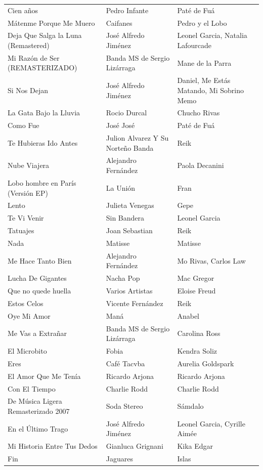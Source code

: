 \begin{longtable}{p{} p{} p{}}
Cien años & Pedro Infante & Paté de Fuá \\
Mátenme Porque Me Muero & Caifanes & Pedro y el Lobo \\
Deja Que Salga la Luna (Remastered) & José Alfredo Jiménez & Leonel Garcia, Natalia Lafourcade \\
Mi Razón de Ser (REMASTERIZADO) & Banda MS de Sergio Lizárraga & Mane de la Parra \\
Si Nos Dejan & José Alfredo Jiménez & Daniel, Me Estás Matando, Mi Sobrino Memo \\
La Gata Bajo la Lluvia & Rocio Durcal & Chucho Rivas \\
Como Fue & José José & Paté de Fuá \\
Te Hubieras Ido Antes & Julion Alvarez Y Su Norteño Banda & Reik \\
Nube Viajera & Alejandro Fernández & Paola Decanini \\
Lobo hombre en París (Versión EP) & La Unión & Fran \\
Lento & Julieta Venegas & Gepe \\
Te Vi Venir & Sin Bandera & Leonel Garcia \\
Tatuajes & Joan Sebastian & Reik \\
Nada & Matisse & Matisse \\
Me Hace Tanto Bien & Alejandro Fernández & Mo Rivas, Carlos Law \\
Lucha De Gigantes & Nacha Pop & Mac Gregor \\
Que no quede huella & Varios Artistas & Eloise Freud \\
Estos Celos & Vicente Fernández & Reik \\
Oye Mi Amor & Maná & Anabel \\
Me Vas a Extrañar & Banda MS de Sergio Lizárraga & Carolina Ross \\
El Microbito & Fobia & Kendra Soliz \\
Eres & Café Tacvba & Aurelia Goldspark \\
El Amor Que Me Tenía & Ricardo Arjona & Ricardo Arjona \\
Con El Tiempo & Charlie Rodd & Charlie Rodd \\
De Música Ligera Remasterizado 2007 & Soda Stereo & Sámdalo \\
En el Último Trago & José Alfredo Jiménez & Leonel Garcia, Cyrille Aimée \\
Mi Historia Entre Tus Dedos & Gianluca Grignani & Kika Edgar \\
Fin & Jaguares & Islas \\

\end{longtable}

